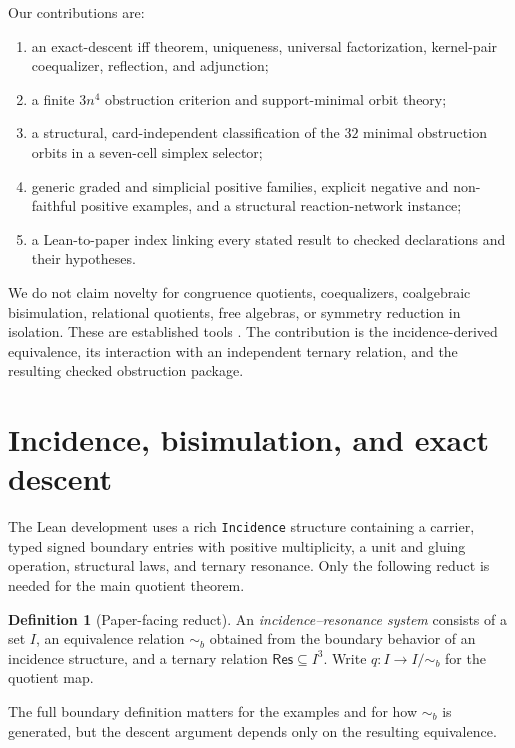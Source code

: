 \documentclass[11pt]{article}
\theoremstyle{definition}
\newtheorem{definition}[theorem]{Definition}
\newcommand{\Res}{\mathsf{Res}}
\newcommand{\Bis}{\mathrel{\sim_{\!b}}}
\newcommand{\Quot}{I/{\sim_{\!b}}}
\begin{document}
Our contributions are:
\begin{enumerate}
\item an exact-descent iff theorem, uniqueness, universal factorization,
kernel-pair coequalizer, reflection, and adjunction;
\item a finite $3n^4$ obstruction criterion and support-minimal orbit theory;
\item a structural, card-independent classification of the $32$ minimal
obstruction orbits in a seven-cell simplex selector;
\item generic graded and simplicial positive families, explicit negative and
non-faithful positive examples, and a structural reaction-network instance;
\item a Lean-to-paper index linking every stated result to checked declarations
and their hypotheses.
\end{enumerate}

We do not claim novelty for congruence quotients, coequalizers, coalgebraic
bisimulation, relational quotients, free algebras, or symmetry reduction in
isolation.  These are established tools
\cite{Rutten2000,Staton2011,Wissmann2020,BurrisSankappanavar,ChajdaLanger2010}.
The contribution is the incidence-derived equivalence, its interaction with an
independent ternary relation, and the resulting checked obstruction package.

\section{Incidence, bisimulation, and exact descent}

The Lean development uses a rich \texttt{Incidence} structure containing a
carrier, typed signed boundary entries with positive multiplicity, a unit and
gluing operation, structural laws, and ternary resonance.  Only the following
reduct is needed for the main quotient theorem.

\begin{definition}[Paper-facing reduct]
An \emph{incidence--resonance system} consists of a set $I$, an equivalence
relation $\Bis$ obtained from the boundary behavior of an incidence structure,
and a ternary relation $\Res\subseteq I^3$.  Write $q:I\to\Quot$ for the quotient
map.
\end{definition}

The full boundary definition matters for the examples and for how $\Bis$ is
generated, but the descent argument depends only on the resulting equivalence.
\end{document}
